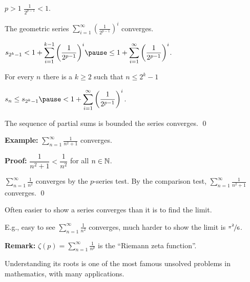 \documentclass[10pt,aspectratio=169]{beamer}
\begin{document}
\begin{frame}
$p > 1$ \wthus $\frac{1}{2^{p-1}} < 1$.

\pause
\medskip

The geometric series
\quad
$\displaystyle
\sum_{i=1}^\infty
{\left(
\frac{1}{2^{p-1}}
\right)}^i$ \quad converges.

\pause
\medskip

\thus\quad
$\displaystyle
s_{2^k-1} < 
1+
\sum_{i=1}^{k-1}
{\left(
\frac{1}{2^{p-1}}
\right)}^i 
\pause
\leq 
1+
\sum_{i=1}^\infty
{\left(
\frac{1}{2^{p-1}}
\right)}^i$.

\pause
\medskip

For every $n$ there is a $k \geq 2$ such that $n \leq 2^k-1$

\pause
\medskip

\thus\qquad
$\displaystyle
s_n \leq s_{2^k-1}
\pause
< 
1+
\sum_{i=1}^\infty
{\left(
\frac{1}{2^{p-1}}
\right)}^i$.

\pause
\medskip

The sequence of partial sums is bounded
\pause
\wthus the series converges.
\qed

\end{frame}

\begin{frame}

\textbf{Example:}
$\displaystyle\sum_{n=1}^\infty \frac{1}{n^2+1}$ converges.

\pause
\medskip

\textbf{Proof:}  $\dfrac{1}{n^2+1} < \dfrac{1}{n^2}$ for all $n \in {\mathbb{N}}$.

\pause
\medskip

$\displaystyle\sum_{n=1}^\infty \frac{1}{n^2}$ converges by the $p$-series test.
%
\pause
\qquad
By the comparison test, $\displaystyle\sum_{n=1}^\infty \frac{1}{n^2+1}$ converges.
\qed

\pause
\medskip

Often easier to show a series converges than it is to find the limit.

\pause
E.g., easy to see
$\displaystyle\sum_{n=1}^\infty \frac{1}{n^2}$ converges,
%
\pause
much harder to show the limit is $\nicefrac{\pi^2}{6}$.

\pause
\medskip

\textbf{Remark:}
$\displaystyle \zeta(p) = \sum_{n=1}^\infty \frac{1}{n^p}$ is the
``Riemann zeta function''.

\pause
Understanding its roots is one of the most famous unsolved problems in
mathematics, with many applications.
\end{frame}
\end{document}
